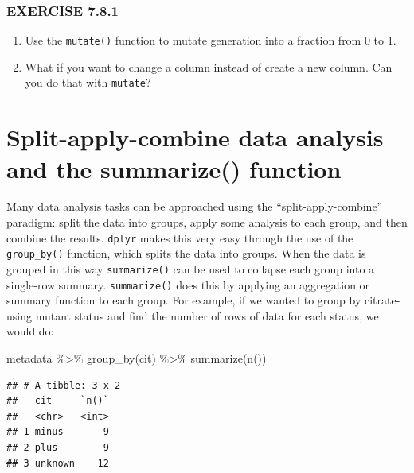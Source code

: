 \documentclass[
]{book}
\newenvironment{Shaded}{\begin{snugshade}}{\end{snugshade}}
\newcommand{\FunctionTok}[1]{\textcolor[rgb]{0.00,0.00,0.00}{#1}}
\newcommand{\NormalTok}[1]{#1}
\newcommand{\SpecialCharTok}[1]{\textcolor[rgb]{0.00,0.00,0.00}{#1}}
\begin{document}
\hypertarget{exercise-7.8.1}{%
\subsubsection*{EXERCISE 7.8.1}\label{exercise-7.8.1}}

\begin{enumerate}
\def\labelenumi{\arabic{enumi}.}
\item
  Use the \texttt{mutate()} function to mutate generation into a fraction from 0 to 1.
\item
  What if you want to change a column instead of create a new column. Can you do that with \texttt{mutate}?
\end{enumerate}

\hypertarget{split-apply-combine-data-analysis-and-the-summarize-function}{%
\section{Split-apply-combine data analysis and the summarize() function}\label{split-apply-combine-data-analysis-and-the-summarize-function}}

Many data analysis tasks can be approached using the ``split-apply-combine'' paradigm: split the data into groups, apply some analysis to each group, and then combine the results. \texttt{dplyr} makes this very easy through the use of the \texttt{group\_by()} function, which splits the data into groups. When the data is grouped in this way \texttt{summarize()} can be used to collapse each group into a single-row summary. \texttt{summarize()} does this by applying an aggregation or summary function to each group. For example, if we wanted to group by citrate-using mutant status and find the number of rows of data for each status, we would do:

\begin{Shaded}
\begin{Highlighting}[]
\NormalTok{metadata }\SpecialCharTok{\%\textgreater{}\%}
  \FunctionTok{group\_by}\NormalTok{(cit) }\SpecialCharTok{\%\textgreater{}\%}
  \FunctionTok{summarize}\NormalTok{(}\FunctionTok{n}\NormalTok{())}
\end{Highlighting}
\end{Shaded}

\begin{verbatim}
## # A tibble: 3 x 2
##   cit     `n()`
##   <chr>   <int>
## 1 minus       9
## 2 plus        9
## 3 unknown    12
\end{verbatim}
\end{document}
